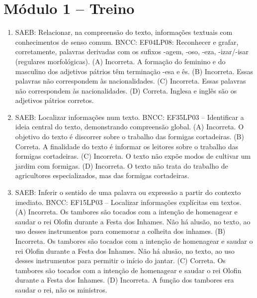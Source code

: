 
\pagebreak
\pagestyle{plain}
\footnotesize

\pagecolor{gray!40}

\section*{Módulo 1 – Treino}

\begin{enumerate}
\item
SAEB: Relacionar, na compreensão do texto, informações textuais
com conhecimentos de senso comum.
BNCC: EF04LP08: Reconhecer e grafar, corretamente, palavras derivadas
com os sufixos -agem, -oso, -eza, -izar/-isar (regulares morfológicas).
(A) Incorreta. A formação do feminino e do masculino dos adjetivos
pátrios têm terminação -esa e ês.
(B) Incorreta. Essas palavras não correspondem às nacionalidades.
(C) Incorreta. Essas palavras não correspondem às nacionalidades.
(D) Correta. Inglesa e inglês são os adjetivos pátrios corretos.

\item
SAEB: Localizar informações num texto.
BNCC: EF35LP03 -- Identificar a ideia central do texto, demonstrando
compreensão global.
(A) Incorreta. O objetivo do texto é discorrer sobre o trabalho das
formigas cortadeiras.
(B) Correta. A finalidade do texto é informar os leitores sobre o
trabalho das formigas cortadeiras.
(C) Incorreta. O texto não expõe modos de cultivar um jardim com formigas.
(D) Incorreta. O texto não trata do trabalho de agricultores 
especializados, mas das formigas cortadeiras.


\item
SAEB: Inferir o sentido de uma palavra ou expressão a partir do
contexto imediato.
BNCC: EF15LP03 -- Localizar informações explícitas em textos.
(A) Incorreta. Os tambores são tocados com a intenção de homenagear e
saudar o rei Olofin durante a Festa dos Inhames. Não há alusão, no texto, ao uso desses instrumentos para comemorar a colheita dos inhames.
(B) Incorreta. Os tambores são tocados com a intenção de homenagear e
saudar o rei Olofin durante a Festa dos Inhames. Não há alusão, no texto, ao uso desses instrumentos para permitir o início do jantar.
(C) Correta. Os tambores são tocados com a intenção de homenagear e
saudar o rei Olofin durante a Festa dos Inhames.
(D) Incorreta. A função dos tambores era saudar o rei, não os ministros.
\end{enumerate}

